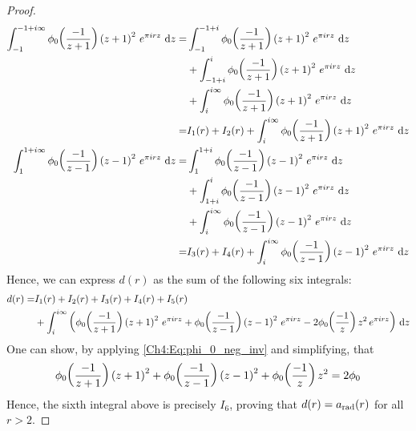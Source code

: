 \begin{proof}
    \begin{align*}
        \int_{-1}^{-1 + i \infty} \phi_0\of{\frac{-1}{z + 1}} \parenth{z + 1}^2 \, e^{\pi i r z} \, \diff{z}
        =& \int_{-1}^{-1 + i} \phi_0\of{\frac{-1}{z + 1}} \parenth{z + 1}^2 \, e^{\pi i r z} \, \diff{z} \\
        &+ \int_{-1 + i}^{i} \phi_0\of{\frac{-1}{z + 1}} \parenth{z + 1}^2 \, e^{\pi i r z} \, \diff{z} \\
        &+ \int_{i}^{i \infty} \phi_0\of{\frac{-1}{z + 1}} \parenth{z + 1}^2 \, e^{\pi i r z} \, \diff{z} \\
        =& I_1(r) + I_2(r) + \int_{i}^{i \infty} \phi_0\of{\frac{-1}{z + 1}} \parenth{z + 1}^2 \, e^{\pi i r z} \, \diff{z} \\
        \int_{1}^{1 + i \infty} \phi_0\of{\frac{-1}{z - 1}} \parenth{z - 1}^2 \, e^{\pi i r z} \, \diff{z}
        =& \int_{1}^{1 + i} \phi_0\of{\frac{-1}{z - 1}} \parenth{z - 1}^2 \, e^{\pi i r z} \, \diff{z} \\
        &+ \int_{1 + i}^{i} \phi_0\of{\frac{-1}{z - 1}} \parenth{z - 1}^2 \, e^{\pi i r z} \, \diff{z} \\
        &+ \int_{i}^{i \infty} \phi_0\of{\frac{-1}{z - 1}} \parenth{z - 1}^2 \, e^{\pi i r z} \, \diff{z} \\
        =& I_3(r) + I_4(r) + \int_{i}^{i \infty} \phi_0\of{\frac{-1}{z - 1}} \parenth{z - 1}^2 \, e^{\pi i r z} \, \diff{z}
    \end{align*}
    Hence, we can express $d(r)$ as the sum of the following six integrals:
    \begin{align*}
        d(r) =& I_1(r) + I_2(r) + I_3(r) + I_4(r) + I_5(r) \\
        &+ \int_{i}^{i\infty} \left( 
            \phi_0\!\left( \frac{-1}{z + 1} \right) \left( z + 1 \right)^2 \, e^{\pi i r z} +
            \phi_0\!\left( \frac{-1}{z - 1} \right) \left( z - 1 \right)^2 \, e^{\pi i r z} - 2
            \phi_0\!\left( \frac{-1}{z} \right) z^2 \, e^{\pi i r z}
         \right) \, \operatorname{d}\!{z}
    \end{align*}
    One can show, by applying \eqref{Ch4:Eq:phi_0_neg_inv} and simplifying, that
    \begin{align*}
        \phi_0\!\left( \frac{-1}{z + 1} \right) \left( z + 1 \right)^2 +
        \phi_0\!\left( \frac{-1}{z - 1} \right) \left( z - 1 \right)^2 +
        \phi_0\!\left( \frac{-1}{z} \right) z^2 = 2\phi_0
    \end{align*}
    Hence, the sixth integral above is precisely $I_6$, proving that $d(r) = a_{\operatorname{rad}}(r)$ for all $r > 2$.
\end{proof}

